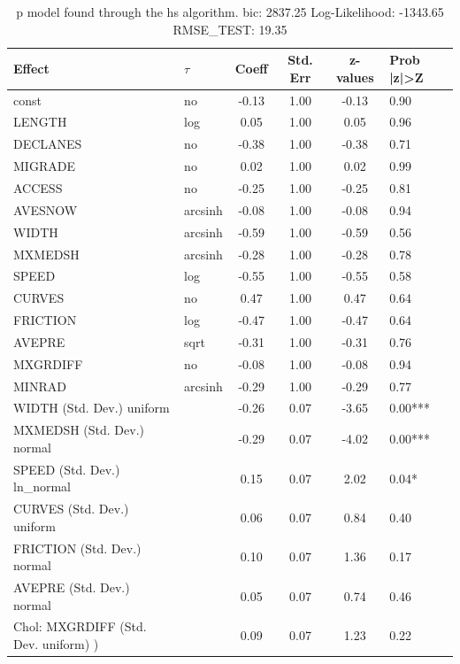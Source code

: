 \begin{table}
	\caption{p model found through the hs algorithm. bic: 2837.25 Log-Likelihood: -1343.65 RMSE_TEST: 19.35}
	\begin{center}
		\begin{tabular}{|l|l|c|c|c|l|}
			\hline
			Effect & $\tau$ & Coeff & Std. Err & z-values & Prob |z|>Z \\
			\hline
			const & no & -0.13 & 1.00 & -0.13 & 0.90 \\
			\hline
			LENGTH & log & 0.05 & 1.00 & 0.05 & 0.96 \\
			\hline
			DECLANES & no & -0.38 & 1.00 & -0.38 & 0.71 \\
			\hline
			MIGRADE & no & 0.02 & 1.00 & 0.02 & 0.99 \\
			\hline
			ACCESS & no & -0.25 & 1.00 & -0.25 & 0.81 \\
			\hline
			AVESNOW & arcsinh & -0.08 & 1.00 & -0.08 & 0.94 \\
			\hline
			WIDTH & arcsinh & -0.59 & 1.00 & -0.59 & 0.56 \\
			\hline
			MXMEDSH & arcsinh & -0.28 & 1.00 & -0.28 & 0.78 \\
			\hline
			SPEED & log & -0.55 & 1.00 & -0.55 & 0.58 \\
			\hline
			CURVES & no & 0.47 & 1.00 & 0.47 & 0.64 \\
			\hline
			FRICTION & log & -0.47 & 1.00 & -0.47 & 0.64 \\
			\hline
			AVEPRE & sqrt & -0.31 & 1.00 & -0.31 & 0.76 \\
			\hline
			MXGRDIFF & no & -0.08 & 1.00 & -0.08 & 0.94 \\
			\hline
			MINRAD & arcsinh & -0.29 & 1.00 & -0.29 & 0.77 \\
			\hline
			WIDTH (Std. Dev.) uniform &  & -0.26 & 0.07 & -3.65 & 0.00*** \\
			\hline
			MXMEDSH (Std. Dev.) normal &  & -0.29 & 0.07 & -4.02 & 0.00*** \\
			\hline
			SPEED (Std. Dev.) ln_normal &  & 0.15 & 0.07 & 2.02 & 0.04* \\
			\hline
			CURVES (Std. Dev.) uniform &  & 0.06 & 0.07 & 0.84 & 0.40 \\
			\hline
			FRICTION (Std. Dev.) normal &  & 0.10 & 0.07 & 1.36 & 0.17 \\
			\hline
			AVEPRE (Std. Dev.) normal &  & 0.05 & 0.07 & 0.74 & 0.46 \\
			\hline
			 Chol: MXGRDIFF (Std. Dev. uniform) ) &  & 0.09 & 0.07 & 1.23 & 0.22 \\

\end{tabular}
\end{center}
\end{table}
